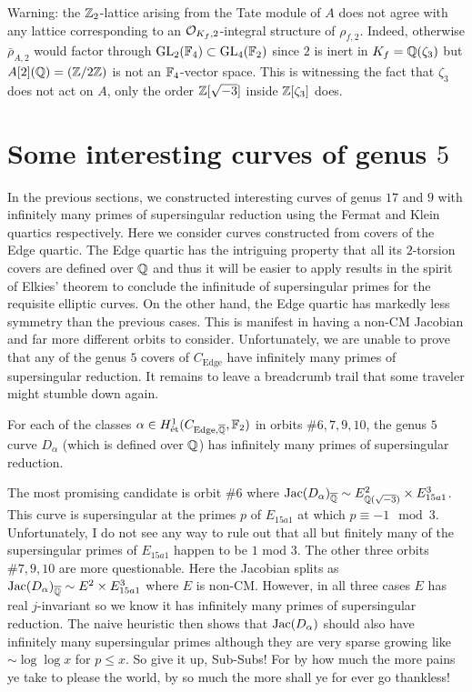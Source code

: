\documentclass[main.tex]{subfiles}
\begin{document}
\begin{rmk}
Warning: the $\mathbb{Z}_{2}$-lattice arising from the Tate module of $A$ does not agree with any lattice corresponding to an $\mathcal{O}_{K_f, 2}$-integral structure of $\rho_{f,2}$. Indeed, otherwise $\bar{\rho}_{A,2}$ would factor through $\mathrm{GL}_2(\mathbb{F}_4) \subset \mathrm{GL}_4(\mathbb{F}_2)$ since $2$ is inert in $K_f = \mathbb{Q}(\zeta_3)$ but $A[2](\mathbb{Q}) = (\mathbb{Z}/2\mathbb{Z})$ is not an $\mathbb{F}_4$-vector space. This is witnessing the fact that $\zeta_3$ does not act on $A$, only the order $\mathbb{Z}[\sqrt{-3}]$ inside $\mathbb{Z}[\zeta_3]$ does.
\end{rmk}

\section{Some interesting curves of genus $5$}

In the previous sections, we constructed interesting curves of genus $17$ and $9$ with infinitely many primes of supersingular reduction using the Fermat and Klein quartics respectively. Here we consider curves constructed from covers of the Edge quartic. The Edge quartic has the intriguing property that all its $2$-torsion covers are defined over $\mathbb{Q}$ and thus it will be easier to apply results in the spirit of Elkies' theorem to conclude the infinitude of supersingular primes for the requisite elliptic curves. On the other hand, the Edge quartic has markedly less symmetry than the previous cases. This is manifest in having a non-CM Jacobian and far more different orbits to consider. Unfortunately, we are unable to prove that any of the genus $5$ covers of $C_{\mathrm{Edge}}$ have infinitely many primes of supersingular reduction. It remains to leave a breadcrumb trail that some traveler might stumble down again.

\begin{conj}
For each of the classes $\alpha \in H^1_{\mathrm{\acute{e}t}}(C_{\mathrm{Edge}, \overline{\mathbb{Q}}}, \mathbb{F}_2)$ in orbits $\# 6,7,9,10$, the genus $5$ curve $D_{\alpha}$ (which is defined over $\mathbb{Q}$) has infinitely many primes of supersingular reduction.
\end{conj}

The most promising candidate is orbit $\# 6$ where $\operatorname{\mathrm{Jac}}(D_{\alpha})_{\overline{\mathbb{Q}}} \sim E_{\mathbb{Q}(\sqrt{-3})}^2 \times  E_{15a1}^3$. This curve is supersingular at the primes $p$ of $E_{15a1}$ at which $p \equiv - 1 \mod 3$. Unfortunately, I do not see any way to rule out that all but finitely many of the supersingular primes of $E_{15a1}$ happen to be $1$ mod $3$. The other three orbits $\# 7,9,10$ are more questionable. Here the Jacobian splits as $\operatorname{\mathrm{Jac}}(D_{\alpha})_{\overline{\mathbb{Q}}} \sim E^2 \times E_{15a1}^3$ where $E$ is non-CM. However, in all three cases $E$ has real $j$-invariant so we know it has infinitely many primes of supersingular reduction. The naive heuristic then shows that $\operatorname{\mathrm{Jac}}(D_{\alpha})$ should also have infinitely many supersingular primes although they are very sparse growing like $\sim \log\log{x}$ for $p \le x$. So give it up, Sub-Subs! For by how much the more pains ye take to please the world, by so much the more shall ye for ever go thankless!

\ifSubfilesClassLoaded{%
  
  
}{}
\end{document}
